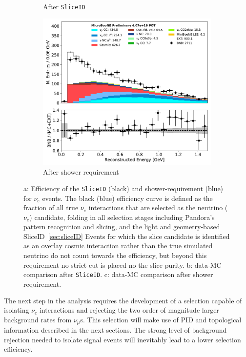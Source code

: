 \begin{figure}[H]
\begin{center}
\begin{subfigure}[b]{0.31\textwidth}
    \caption{\label{fig:nuereco:sliceid} After \texttt{SliceID}}
    \end{subfigure}
    \begin{subfigure}[b]{0.31\textwidth}
    \centering
    \includegraphics[width=1.00\textwidth]{nureco/reco_e_01152020.pdf}
    \caption{\label{fig:nuereco:shower} After shower requirement}
    \end{subfigure}
\caption{\label{fig:nuereco} a: Efficiency of the \texttt{SliceID} (black) and shower-requirement (blue) for $\nu_e$ events. The black (blue) efficiency curve is defined as the fraction of all true $\nu_e$ interactions that are selected as the neutrino ($\nu_e$) candidate, folding in all selection stages including Pandora's pattern recognition and slicing, and the light and geometry-based SliceID~\ref{sec:sliceID} Events for which the slice candidate is identified as an overlay cosmic interaction rather than the true simulated neutrino do not count towards the efficiency, but beyond this requirement no strict cut is placed no the slice purity. b: data-MC comparison after \texttt{SliceID}. c: data-MC comparison after shower requirement. }
\end{center}
\end{figure}

\par The next step in the analysis requires the development of a selection capable of isolating $\nu_e$ interactions and rejecting the two order of magnitude larger background rates from $\nu_{\mu}$s. This selection will make use of PID and topological information described in the next sections. The strong level of background rejection needed to isolate signal events will inevitably lead to a lower selection efficiency.


